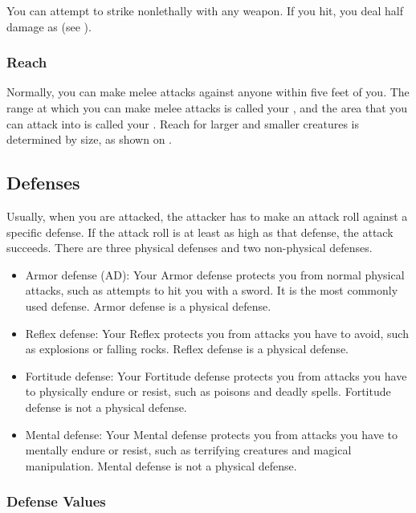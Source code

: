              You can attempt to strike nonlethally with any weapon.
            If you hit, you deal half damage as  (see ).

        \subsubsection{Reach}\label{Reach}
            Normally, you can make melee attacks against anyone within five feet of you.
            The range at which you can make melee attacks is called your , and the area that you can attack into is called your .
            Reach for larger and smaller creatures is determined by size, as shown on .

    \subsection{Defenses}\label{Defenses}
        Usually, when you are attacked, the attacker has to make an attack roll against a specific defense.
        If the attack roll is at least as high as that defense, the attack succeeds.
        There are three physical defenses and two non-physical defenses.
        \begin{itemize}
            \item Armor defense (AD): Your Armor defense protects you from normal physical attacks, such as attempts to hit you with a sword.
                It is the most commonly used defense.
                Armor defense is a physical defense.
            \item Reflex defense: Your Reflex protects you from attacks you have to avoid, such as explosions or falling rocks.
                Reflex defense is a physical defense.
            \item Fortitude defense: Your Fortitude defense protects you from attacks you have to physically endure or resist, such as poisons and deadly spells.
                Fortitude defense is not a physical defense.
            \item Mental defense: Your Mental defense protects you from attacks you have to mentally endure or resist, such as terrifying creatures and magical manipulation.
                Mental defense is not a physical defense.
        \end{itemize}

        \subsubsection{Defense Values}\label{Defense Values}

